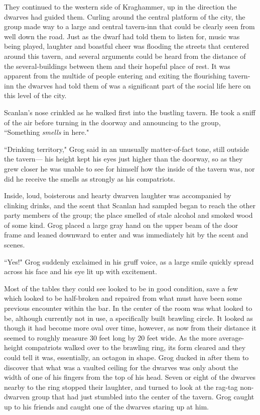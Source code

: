 They continued to the western side of Kraghammer, up in the direction the dwarves had guided them. Curling around the central platform of the city, the group made way to a large and central tavern-inn that could be clearly seen from well down the road. Just as the dwarf had told them to listen for, music was being played, laughter and boastful cheer was flooding the streets that centered around this tavern, and several arguments could be heard from the distance of the several-buildings between them and their hopeful place of rest. It was apparent from the multide of people entering and exiting the flourishing tavern-inn the dwarves had told them of was a significant part of the social life here on this level of the city.

Scanlan's nose crinkled as he walked first into the bustling tavern. He took a sniff of the air before turning in the doorway and announcing to the group, ``Something \textit{smells} in here."

``Drinking territory," Grog said in an unusually matter-of-fact tone, still outside the tavern--- his height kept his eyes just higher than the doorway, so as they grew closer he was unable to see for himself how the inside of the tavern was, nor did he receive the smells as strongly as his compatriots. 

Inside, loud, boisterous and hearty dwarven laughter was accompanied by clinking drinks, and the scent that Scanlan had sampled began to reach the other party members of the group; the place smelled of stale alcohol and smoked wood of some kind. Grog placed a large gray hand on the upper beam of the door frame and leaned downward to enter and was immediately hit by the scent and scenes. 

``Yes!" Grog suddenly exclaimed in his gruff voice, as a large smile quickly spread across his face and his eye lit up with excitement.

Most of the tables they could see looked to be in good condition, save a few which looked to be half-broken and repaired from what must have been some previous encounter within the bar. In the center of the room was what looked to be, although currently not in use, a specifically built brawling circle. It looked as though it had become more oval over time, however, as now from their distance it seemed to roughly measure 30 feet long by 20 feet wide. As the more average-height compatriots walked over to the brawling ring, its form cleared and they could tell it was, essentially, an octagon in shape. Grog ducked in after them to discover that what was a vaulted ceiling for the dwarves was only about the width of one of his fingers from the top of his head. Seven or eight of the dwarves nearby to the ring stopped their laughter, and turned to look at the rag-tag non-dwarven group that had just stumbled into the center of the tavern. Grog caught up to his friends and caught one of the dwarves staring up at him.

